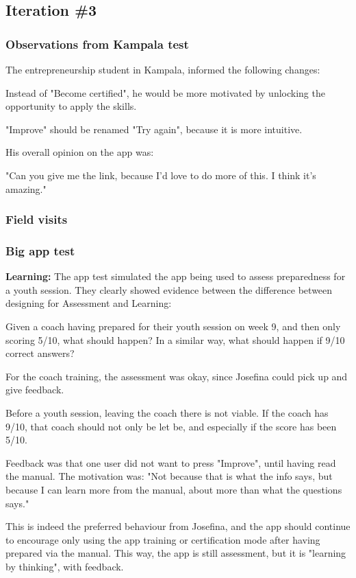 \subsection{Iteration \#3}


  \subsubsection{Observations from Kampala test}
  The entrepreneurship student in Kampala, informed the following changes:

  Instead of "Become certified", he would be more motivated by unlocking the opportunity to apply the skills.

  "Improve" should be renamed "Try again", because it is more intuitive.

  His overall opinion on the app was:

  "Can you give me the link, because I'd love to do more of this. I think it's amazing."

  \subsubsection{Field visits}

  \subsubsection{Big app test}
  \textbf{Learning: } The app test simulated the app being used to assess preparedness for a youth session. They clearly showed evidence between the difference between designing for Assessment and Learning:

  Given a coach having prepared for their youth session on week 9, and then only scoring 5/10, what should happen? In a similar way, what should happen if 9/10 correct answers?

  For the coach training, the assessment was okay, since Josefina could pick up and give feedback.

  Before a youth session, leaving the coach there is not viable. If the coach has 9/10, that coach should not only be let be, and especially if the score has been 5/10.

  Feedback was that one user did not want to press "Improve", until having read the manual. The motivation was: "Not because that is what the info says, but because I can learn more from the manual, about more than what the questions says."

  This is indeed the preferred behaviour from Josefina, and the app should continue to encourage only using the app training or certification mode after having prepared via the manual. This way, the app is still assessment, but it is "learning by thinking", with feedback.
